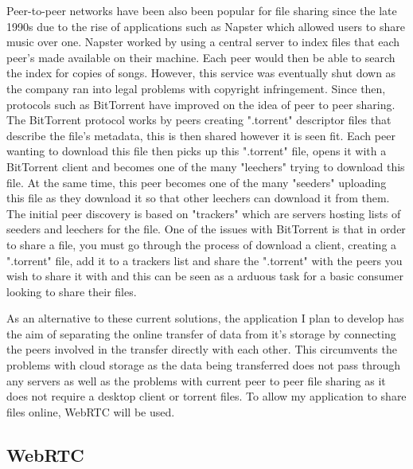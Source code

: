 \documentclass[]{report}
\begin{document}
			Peer-to-peer networks have been also been popular for file sharing since the late 1990s due to the rise of applications such as Napster which allowed users to share music over one. Napster worked by using a central server to index files that each peer's made available on their machine. Each peer would then be able to search the index for copies of songs. However, this service was eventually shut down as the company ran into legal problems with copyright infringement. Since then, protocols such as BitTorrent have improved on the idea of peer to peer sharing. The BitTorrent protocol works by peers creating ".torrent" descriptor files that describe the file's metadata, this is then shared however it is seen fit. Each peer wanting to download this file then picks up this ".torrent" file, opens it with a BitTorrent client and becomes one of the many "leechers" trying to download this file. At the same time, this peer becomes one of the many "seeders" uploading this file as they download it so that other leechers can download it from them. The initial peer discovery is based on "trackers" which are servers hosting lists of seeders and leechers for the file. One of the issues with BitTorrent is that in order to share a file, you must go through the process of download a client, creating a ".torrent" file, add it to a trackers list and share the ".torrent" with the peers you wish to share it with and this can be seen as a arduous task for a basic consumer looking to share their files. 

			As an alternative to these current solutions, the application I plan to develop has the aim of separating the online transfer of data from it's storage by connecting the peers involved in the transfer directly with each other. This circumvents the problems with cloud storage as the data being transferred does not pass through any servers as well as the problems with current peer to peer file sharing as it does not require a desktop client or torrent files. To allow my application to share files online, WebRTC will be used.
			
			\subsection*{WebRTC}
			
\end{document}
